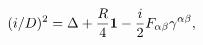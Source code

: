 \begin{equation}
(i\slash D )^2=\Delta +{R\over 4}{\bf 1} 
-{i\over 2} F_{\alpha\beta}\gamma^{\alpha\beta},
\label{Hamiltonian}
\end{equation}

